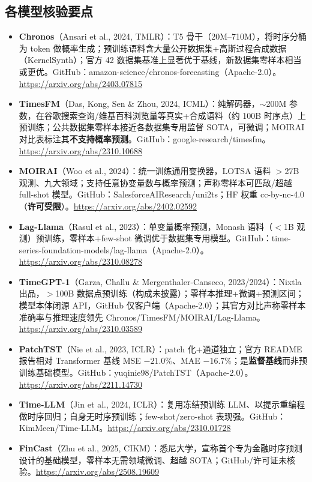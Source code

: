 \documentclass[11pt,a4paper]{article}
\begin{document}
\subsection{各模型核验要点}
\begin{itemize}
\item \textbf{Chronos}（Ansari et al., 2024, TMLR）：T5 骨干（20M--710M），将时序分桶为 token 做概率生成；预训练语料含大量公开数据集+高斯过程合成数据（KernelSynth）；官方 42 数据集基准上显著优于基线，新数据集零样本相当或更优。GitHub：amazon-science/chronos-forecasting（Apache-2.0）。\url{https://arxiv.org/abs/2403.07815}
\item \textbf{TimesFM}（Das, Kong, Sen \& Zhou, 2024, ICML）：纯解码器，$\sim$200M 参数，在谷歌搜索查询/维基百科浏览量等真实+合成语料（约 100B 时序点）上预训练；公共数据集零样本接近各数据集专用监督 SOTA，可微调；MOIRAI 对比表标注其\textbf{不支持概率预测}。GitHub：google-research/timesfm。\url{https://arxiv.org/abs/2310.10688}
\item \textbf{MOIRAI}（Woo et al., 2024）：统一训练通用变换器，LOTSA 语料 $>$27B 观测、九大领域；支持任意协变量数与概率预测；声称零样本可匹敌/超越 full-shot 模型。GitHub：SalesforceAIResearch/uni2ts；HF 权重 cc-by-nc-4.0（\textbf{许可受限}）。\url{https://arxiv.org/abs/2402.02592}
\item \textbf{Lag-Llama}（Rasul et al., 2023）：单变量概率预测，Monash 语料（$<$1B 观测）预训练，零样本+few-shot 微调优于数据集专用模型。GitHub：time-series-foundation-models/lag-llama（Apache-2.0）。\url{https://arxiv.org/abs/2310.08278}
\item \textbf{TimeGPT-1}（Garza, Challu \& Mergenthaler-Canseco, 2023/2024）：Nixtla 出品，$>$100B 数据点预训练（构成未披露）；零样本推理+微调+预测区间；模型本体闭源 API，GitHub 仅客户端（Apache-2.0）；其官方对比声称零样本准确率与推理速度领先 Chronos/TimesFM/MOIRAI/Lag-Llama。\url{https://arxiv.org/abs/2310.03589}
\item \textbf{PatchTST}（Nie et al., 2023, ICLR）：patch 化+通道独立；官方 README 报告相对 Transformer 基线 MSE $-21.0\%$、MAE $-16.7\%$；是\textbf{监督基线}而非预训练基础模型。GitHub：yuqinie98/PatchTST（Apache-2.0）。\url{https://arxiv.org/abs/2211.14730}
\item \textbf{Time-LLM}（Jin et al., 2024, ICLR）：复用冻结预训练 LLM、以提示重编程做时序回归；自身无时序预训练；few-shot/zero-shot 表现强。GitHub：KimMeen/Time-LLM。\url{https://arxiv.org/abs/2310.01728}
\item \textbf{FinCast}（Zhu et al., 2025, CIKM）：悉尼大学，宣称首个专为金融时序预测设计的基础模型，零样本无需领域微调、超越 SOTA；GitHub/许可证未核验。\url{https://arxiv.org/abs/2508.19609}
\end{itemize}
\end{document}
